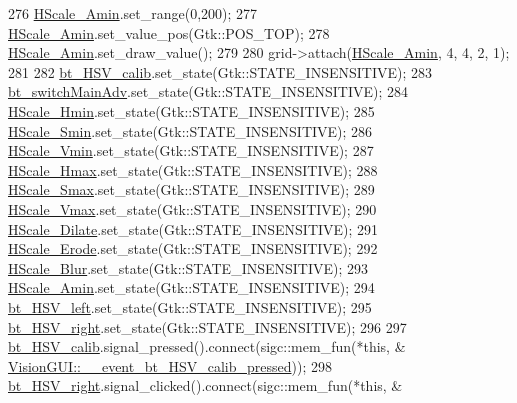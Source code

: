 \begin{DoxyCode}
276     \hyperlink{class_vision_g_u_i_a72d3a4fe84821ceafeb4293f196aacd7}{HScale\_Amin}.set\_range(0,200);
277     \hyperlink{class_vision_g_u_i_a72d3a4fe84821ceafeb4293f196aacd7}{HScale\_Amin}.set\_value\_pos(Gtk::POS\_TOP);
278     \hyperlink{class_vision_g_u_i_a72d3a4fe84821ceafeb4293f196aacd7}{HScale\_Amin}.set\_draw\_value();
279 
280     grid->attach(\hyperlink{class_vision_g_u_i_a72d3a4fe84821ceafeb4293f196aacd7}{HScale\_Amin}, 4, 4, 2, 1);
281 
282     \hyperlink{class_vision_g_u_i_a9506af83c1ee97d1b4f32b3fbb53fc48}{bt\_HSV\_calib}.set\_state(Gtk::STATE\_INSENSITIVE);
283     \hyperlink{class_vision_g_u_i_a62b2427b20780649d71611c6cdb6a10a}{bt\_switchMainAdv}.set\_state(Gtk::STATE\_INSENSITIVE);
284     \hyperlink{class_vision_g_u_i_a8cc0de8ce9ca9c05d1c47176b724ecc3}{HScale\_Hmin}.set\_state(Gtk::STATE\_INSENSITIVE);
285     \hyperlink{class_vision_g_u_i_a23eb7af1cc6d3a055892de4704b48126}{HScale\_Smin}.set\_state(Gtk::STATE\_INSENSITIVE);
286     \hyperlink{class_vision_g_u_i_a8a1e7f6d4357eceab8e47fe0fb523cf9}{HScale\_Vmin}.set\_state(Gtk::STATE\_INSENSITIVE);
287     \hyperlink{class_vision_g_u_i_a0b1bb9b8a70bd1f93427f71d0e885313}{HScale\_Hmax}.set\_state(Gtk::STATE\_INSENSITIVE);
288     \hyperlink{class_vision_g_u_i_a147e8499bd7412fdb732103c0754f013}{HScale\_Smax}.set\_state(Gtk::STATE\_INSENSITIVE);
289     \hyperlink{class_vision_g_u_i_ab277d08dcce9e2521b9d4c542be69247}{HScale\_Vmax}.set\_state(Gtk::STATE\_INSENSITIVE);
290     \hyperlink{class_vision_g_u_i_a6a7c757a11a2699e841b6b49fe18d1de}{HScale\_Dilate}.set\_state(Gtk::STATE\_INSENSITIVE);
291     \hyperlink{class_vision_g_u_i_ad4bc77416f4e50fa03a7cc7f64a2d78e}{HScale\_Erode}.set\_state(Gtk::STATE\_INSENSITIVE);
292     \hyperlink{class_vision_g_u_i_a88fa2852521012287ae804404280c57f}{HScale\_Blur}.set\_state(Gtk::STATE\_INSENSITIVE);
293     \hyperlink{class_vision_g_u_i_a72d3a4fe84821ceafeb4293f196aacd7}{HScale\_Amin}.set\_state(Gtk::STATE\_INSENSITIVE);
294     \hyperlink{class_vision_g_u_i_a98323988d4a353190a02c827de0cecbf}{bt\_HSV\_left}.set\_state(Gtk::STATE\_INSENSITIVE);
295     \hyperlink{class_vision_g_u_i_a3b19593890776c5c77e1a39ac3af627d}{bt\_HSV\_right}.set\_state(Gtk::STATE\_INSENSITIVE);
296 
297     \hyperlink{class_vision_g_u_i_a9506af83c1ee97d1b4f32b3fbb53fc48}{bt\_HSV\_calib}.signal\_pressed().connect(sigc::mem\_fun(*\textcolor{keyword}{this}, &
      \hyperlink{class_vision_g_u_i_ad476738b0d45d8decb5d5789c7cbc611}{VisionGUI::\_\_event\_bt\_HSV\_calib\_pressed}));
298     \hyperlink{class_vision_g_u_i_a3b19593890776c5c77e1a39ac3af627d}{bt\_HSV\_right}.signal\_clicked().connect(sigc::mem\_fun(*\textcolor{keyword}{this}, &

\end{DoxyCode}
